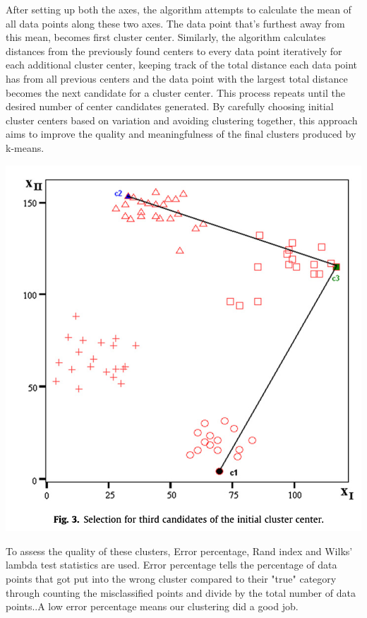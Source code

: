 \documentclass[12pt,letterpaper]{article}
\begin{document}
\vspace{.25cm}


After setting up both the axes, the algorithm attempts to calculate the mean of all data points along these two axes. The data point that's furthest away from this mean, becomes first cluster center. Similarly, the algorithm calculates distances from the previously found centers to every data point iteratively for each additional cluster center, keeping track of the total distance each data point has from all previous centers and the data point with the largest total distance becomes the next candidate for a cluster center. This process repeats until the desired number of center candidates generated. By carefully choosing initial cluster centers based on variation and avoiding clustering together, this approach aims to improve the quality and meaningfulness of the final clusters produced by k-means.

\vspace{.25cm}
\includegraphics[scale=0.4]{image3}

\vspace{.25cm}
To assess the quality of these clusters, Error percentage, Rand index and Wilks' lambda test statistics are used. Error percentage tells the percentage of data points that got put into the wrong cluster compared to their "true" category through counting the misclassified points and divide by the total number of data points..A low error percentage means our clustering did a good job. 
\end{document}
